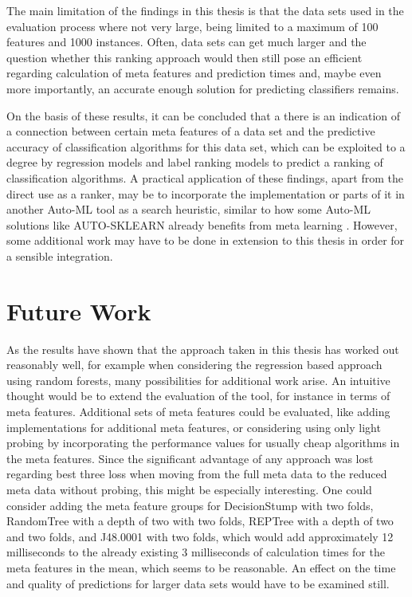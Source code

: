 The main limitation of the findings in this thesis is that the data sets used in the evaluation process where not very large, being limited to a maximum of 100 features and 1000 instances. Often, data sets can get much larger and the question whether this ranking approach would then still pose an efficient regarding calculation of meta features and prediction times and, maybe even more importantly, an accurate enough solution for predicting classifiers remains. 

On the basis of these results, it can be concluded that a there is an indication of a connection between certain meta features of a data set and the predictive accuracy of classification algorithms for this data set, which can be exploited to a degree by regression models and label ranking models to predict a ranking of classification algorithms. A practical application of these findings, apart from the direct use as a ranker, may be to incorporate the implementation or parts of it in another Auto-ML tool as a search heuristic, similar to how some Auto-ML solutions like AUTO-SKLEARN already benefits from meta learning \cite{feurer2015efficient}. However, some additional work may have to be done in extension to this thesis in order for a sensible integration.

\section{Future Work}
\label{sec:conclusion:future}
As the results have shown that the approach taken in this thesis has worked out reasonably well, for example when considering the regression based approach using random forests, many possibilities for additional work arise. An intuitive thought would be to extend the evaluation of the tool, for instance in terms of meta features. Additional sets of meta features could be evaluated, like adding implementations for additional meta features, or considering using only light probing by incorporating the performance values for usually cheap algorithms in the meta features. Since the significant advantage of any approach was lost regarding best three loss when moving from the full meta data to the reduced meta data without probing, this might be especially interesting. One could consider adding the meta feature groups for DecisionStump with two folds, RandomTree with a depth of two with two folds, REPTree with a depth of two and two folds, and J48.0001 with two folds, which would add approximately 12 milliseconds to the already existing 3 milliseconds of calculation times for the meta features in the mean, which seems to be reasonable. An effect on the time and quality of predictions for larger data sets would have to be examined still.

